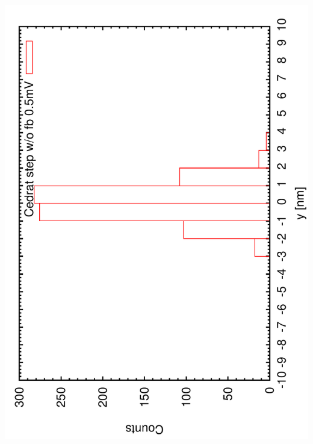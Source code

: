 \documentclass[a4paper,11pt]{book}
\begin{document}
\includegraphics[angle=-90,scale=0.15]{imagestep31.pdf}
\end{document}
